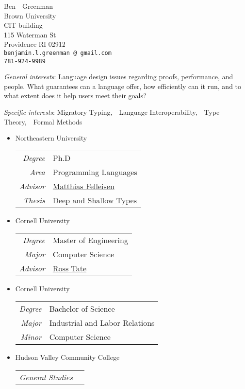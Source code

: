\documentclass[11pt]{article}
\makeatletter
\renewcommand{\maketitle}{
\begin{center}
  {\large{Ben~~Greenman}}
\vspace{0.1cm}
\\Brown University
\\CIT building
\\115 Waterman St
\\Providence RI 02912
\\\texttt{\footnotesize benjamin.l.greenman\,@\,gmail.com}
\\\texttt{\footnotesize 781-924-9989}
\end{center}
}
\makeatother
\begin{document}
\maketitle


\newcommand{\interestpar}[2]{\noindent\emph{#1}\/: #2}
\newcommand{\isep}{,~~}

\interestpar{General interests}{
Language design
issues regarding
proofs, performance, and people.
What guarantees can a language offer,
how efficiently can it run,
and to what extent does it help users meet their goals?
}

\interestpar{Specific interests}{Migratory Typing\isep{}Language Interoperability\isep{}Type Theory\isep{}Formal Methods}


\begin{itemize}
\item {Northeastern University} \hfill {}\\
\begin{tabular}{>{\it}r l}
Degree & Ph.D \\
Area & Programming Languages \\
Advisor & \href{http://ccs.neu.edu/home/matthias}{Matthias Felleisen} \\
Thesis & \href{http://ccs.neu.edu/home/types/resources/pdf/g-dissertation-2020.pdf}{Deep and Shallow Types}
\end{tabular}

\item {Cornell University} \hfill {}\\
\begin{tabular}{>{\it}r l}
Degree & Master of Engineering\\
Major & Computer Science\\
Advisor & \href{http://www.cs.cornell.edu/~ross/}{Ross Tate}
\end{tabular}

\item {Cornell University} \hfill {}\\
\begin{tabular}{>{\it}r l}
Degree & Bachelor of Science\\
Major & Industrial and Labor Relations\\
Minor & Computer Science\\
\end{tabular}

\item {Hudson Valley Community College} \hfill {}\\
\begin{tabular}{>{\it}r l}
General Studies & \\
\end{tabular}
\end{itemize}
\end{document}
